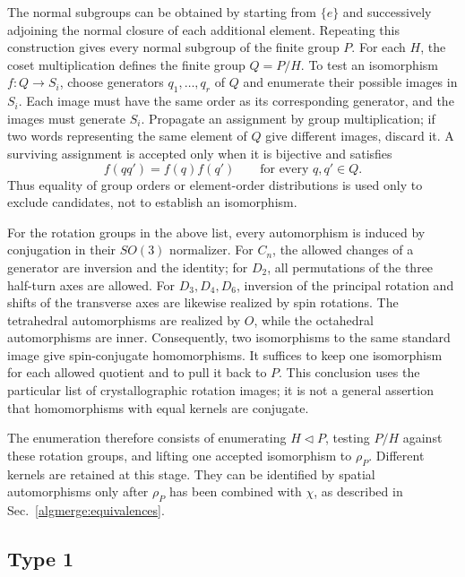 The normal subgroups can be obtained by starting from $\{e\}$ and
successively adjoining the normal closure of each additional element.
Repeating this construction gives every normal subgroup of the finite
group $P$. For each $H$, the coset multiplication defines the finite
group $Q=P/H$. To test an isomorphism $f:Q\to S_i$, choose generators
$q_1,\ldots,q_r$ of $Q$ and enumerate their possible images in $S_i$.
Each image must have the same order as its corresponding generator,
and the images must generate $S_i$. Propagate an assignment by group
multiplication; if two words representing the same element of $Q$
give different images, discard it. A surviving assignment is accepted
only when it is bijective and satisfies
\begin{equation}
 f(q q')=f(q)f(q')\qquad\text{for every }q,q'\in Q.
 \tag{12a}\label{algmerge:isomorphism}
\end{equation}
Thus equality of group orders or element-order distributions is used
only to exclude candidates, not to establish an isomorphism.

For the rotation groups in the above list, every automorphism is
induced by conjugation in their $SO(3)$ normalizer. For $C_n$, the
allowed changes of a generator are inversion and the identity; for
$D_2$, all permutations of the three half-turn axes are allowed. For
$D_3,D_4,D_6$, inversion of the principal rotation and shifts of the
transverse axes are likewise realized by spin rotations. The
tetrahedral automorphisms are realized by $O$, while the octahedral
automorphisms are inner. Consequently, two isomorphisms to the same
standard image give spin-conjugate homomorphisms. It suffices to keep
one isomorphism for each allowed quotient and to pull it back to $P$.
This conclusion uses the particular list of crystallographic rotation
images; it is not a general assertion that homomorphisms with equal
kernels are conjugate.

The enumeration therefore consists of enumerating $H\lhd P$, testing
$P/H$ against these rotation groups, and lifting one accepted
isomorphism to $\rho_P$. Different kernels are retained at this stage.
They can be identified by spatial automorphisms only after $\rho_P$
has been combined with $\chi$, as described in
Sec.~\ref{algmerge:equivalences}.

\subsection{Type 1}
\label{algmerge:type1}

